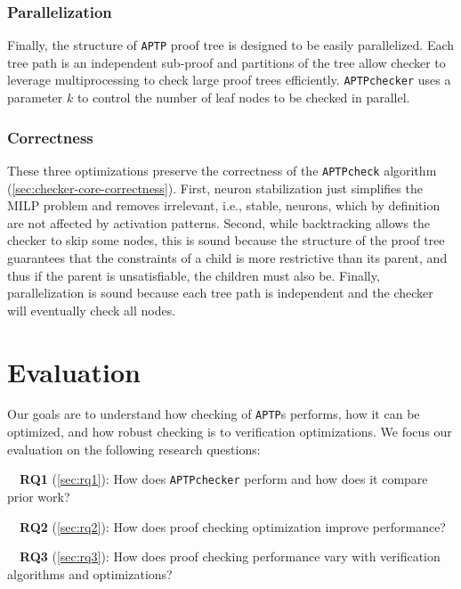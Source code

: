 \documentclass[oneside,11pt,dvipsnames]{book}
\newcommand{\nnproofcheck}{\texttt{APTPcheck}}
\newcommand{\nnproofchecker}{\texttt{APTPchecker}}
\newcommand{\nnproofformat}{\texttt{APTP}}
\begin{document}
\subsubsection{Parallelization} Finally, the structure of \nnproofformat{} proof tree is designed to be easily parallelized.  Each tree path is an independent sub-proof and partitions of the tree allow checker to leverage multiprocessing to check large proof trees efficiently. \nnproofchecker{} uses a parameter $k$ to control the number of leaf nodes to be checked in parallel.


\subsubsection{Correctness} These three optimizations preserve the correctness of the \nnproofcheck{} algorithm (\autoref{sec:checker-core-correctness}). First, neuron stabilization just simplifies the MILP problem and removes irrelevant, i.e., stable, neurons, which by definition are not affected by activation patterns. Second, while backtracking allows the checker to skip some nodes, this is sound because the structure of the proof tree guarantees that the constraints of a child is more restrictive than its parent, and thus if the parent is unsatisfiable, the children must also be. Finally, parallelization is sound because each tree path is independent and the checker will eventually check all nodes.



\section{Evaluation}\label{sec:evaluation}  
Our goals are to understand how checking of \nnproofformat{}s performs, how it can be optimized, and how robust checking is to
verification optimizations.
We focus our evaluation on the following research questions:

\noindent\mbox{~~}\textbf{RQ1} (\autoref{sec:rq1}): How does \nnproofchecker{} perform and how does it compare prior work? 

\noindent\mbox{~~}\textbf{RQ2} (\autoref{sec:rq2}): How does proof checking optimization improve performance?

\noindent\mbox{~~}\textbf{RQ3} (\autoref{sec:rq3}): How does proof checking performance vary with verification algorithms and optimizations?
\end{document}
